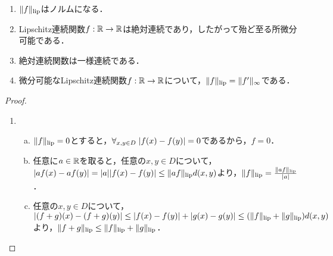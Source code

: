\documentclass[uplatex,dvipdfmx]{jsreport}
\begin{document}
\begin{lemma}[Lipschitz連続性]\mbox{}
    \begin{enumerate}
        \item $\|f\|_{\textrm{lip}}$はノルムになる．
        \item Lipschitz連続関数$f:\mathbb{R}\to\mathbb{R}$は絶対連続であり，したがって殆ど至る所微分可能である．
        \item 絶対連続関数は一様連続である．
        \item 微分可能なLipschitz連続関数$f:\mathbb{R}\to\mathbb{R}$について，$\|f\|_{\textrm{lip}}=\|f'\|_\infty$である．
    \end{enumerate}
\end{lemma}
\begin{proof}\mbox{}
    \begin{enumerate}
        \item \begin{enumerate}[(a)]
            \item $\|f\|_{\textrm{lip}}=0$とすると，$\forall_{x,y\in D}\;\lvert f(x)-f(y)\rvert=0$であるから，$f=0$．
            \item 任意に$a\in\mathbb{R}$を取ると，任意の$x,y\in D$について，$\lvert af(x)-af(y)\rvert=\lvert a\rvert\lvert f(x)-f(y)\rvert\le\|af\|_{\textrm{lip}} d(x,y)$より，$\|f\|_{\textrm{lip}}=\frac{\|af\|_{\textrm{lip}}}{\lvert a\rvert}$．
            \item 任意の$x,y\in D$について，$\lvert(f+g)(x)-(f+g)(y)\rvert\le\lvert f(x)-f(y)\rvert+\lvert g(x)-g(y)\rvert\le(\|f\|_{\textrm{lip}}+\|g\|_{\textrm{lip}})d(x,y)$より，$\|f+g\|_{\textrm{lip}}\le\|f\|_{\textrm{lip}}+\|g\|_{\textrm{lip}}$．
        \end{enumerate}
    \end{enumerate}
\end{proof}
\end{document}
